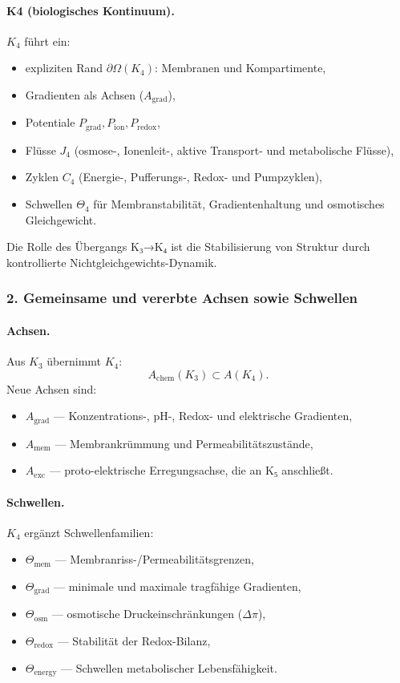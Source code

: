 \paragraph{K4 (biologisches Kontinuum).}
$K_4$ führt ein:
\begin{itemize}
  \item expliziten Rand $\partial\Omega(K_4)$: Membranen und Kompartimente,
  \item Gradienten als Achsen ($A_{\mathrm{grad}}$),
  \item Potentiale $P_{\mathrm{grad}}, P_{\mathrm{ion}}, P_{\mathrm{redox}}$,
  \item Flüsse $J_4$ (osmose-, Ionenleit-, aktive Transport- und
        metabolische Flüsse),
  \item Zyklen $C_4$ (Energie-, Pufferungs-, Redox- und Pumpzyklen),
  \item Schwellen $\Theta_4$ für Membranstabilität, Gradientenhaltung und osmotisches
        Gleichgewicht.
\end{itemize}

Die Rolle des Übergangs K₃→K₄ ist die Stabilisierung von Struktur durch
kontrollierte Nichtgleichgewichts-Dynamik.

\subsubsection{2. Gemeinsame und vererbte Achsen sowie Schwellen}

\paragraph{Achsen.}
Aus $K_3$ übernimmt $K_4$:
\[
A_{\mathrm{chem}}(K_3) \subset A(K_4).
\]
Neue Achsen sind:
\begin{itemize}
  \item $A_{\mathrm{grad}}$ — Konzentrations-, pH-, Redox- und elektrische
        Gradienten,
  \item $A_{\mathrm{mem}}$ — Membrankrümmung und Permeabilitätszustände,
  \item $A_{\mathrm{exc}}$ — proto-elektrische Erregungsachse, die an K₅ anschließt.
\end{itemize}

\paragraph{Schwellen.}
$K_4$ ergänzt Schwellenfamilien:
\begin{itemize}
  \item $\Theta_{\mathrm{mem}}$ — Membranriss-/Permeabilitätsgrenzen,
  \item $\Theta_{\mathrm{grad}}$ — minimale und maximale tragfähige Gradienten,
  \item $\Theta_{\mathrm{osm}}$ — osmotische Druckeinschränkungen ($\Delta\pi$),
  \item $\Theta_{\mathrm{redox}}$ — Stabilität der Redox-Bilanz,
  \item $\Theta_{\mathrm{energy}}$ — Schwellen metabolischer Lebensfähigkeit.
\end{itemize}


